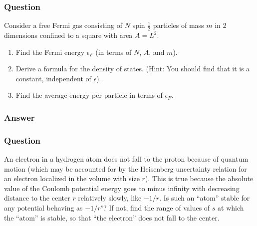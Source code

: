 \subsubsection{Question}
Consider a free Fermi gas consisting of $N$ spin $\frac{1}{2}$ particles of mass $m$ in 2 dimensions confined to a square with area $A = L^2$. 
\begin{enumerate}
	\item Find the Fermi energy $\epsilon_F$ (in terms of $N$, $A$, and $m$).
	\item Derive a formula for the density of states. (Hint: You should find that it is a constant, independent of $\epsilon$).
	\item Find the average energy per particle in terms of $\epsilon_F$.
\end{enumerate}
\subsubsection{Answer}



\subsubsection{Question}
An electron in a hydrogen atom does not fall to the proton because of quantum motion (which may be accounted for by the Heisenberg uncertainty relation for an electron localized in the volume with size $r$). This is true because the absolute value of the Coulomb potential energy goes to minus infinity with decreasing distance to the center $r$ relatively slowly, like $-1/r$. Is such an ``atom'' stable for any potential behaving as $-1/r^s$? If not, find the range of values of $s$ at which the ``atom'' is stable, so that ``the electron'' does not fall to the center.
